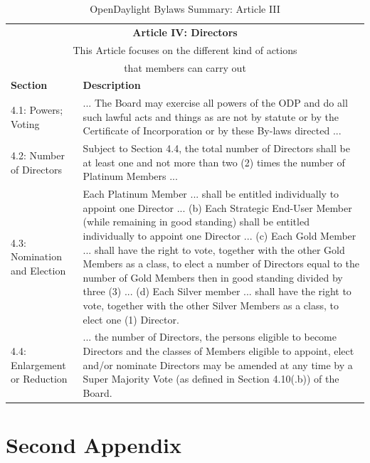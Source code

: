 \documentclass[a4paper, 12pt]{book}
\begin{document}
\begin{table}[H]
  \begin{center}
    \begin{tabular}{ | p{4cm} | p{11cm} | }
    \toprule
    \multicolumn {2}{|c|}{\textbf{Article IV: Directors}} \\
    \multicolumn {2}{|c|}{This Article focuses on the different kind of actions} \\
    \multicolumn {2}{|c|}{that members can carry out} \\
    \hline
    \textbf{Section} & \textbf{Description} \\
    \hline
    4.1: Powers; Voting & ... The Board may exercise all powers of the ODP and do all such lawful acts and things as are not by statute or by the Certificate of Incorporation or by these By-laws directed ...\\
    \hline
    4.2: Number of Directors & Subject to Section 4.4, the total number of Directors shall be at least one and not more than two (2) times the number of Platinum Members ...\\
    \hline
    4.3:  Nomination and Election & Each Platinum Member ... shall be entitled individually to appoint one Director ... (b) Each Strategic End-User Member (while remaining in good standing) shall be entitled individually to appoint one Director ... (c) Each Gold Member ... shall have the right to vote, together with the other Gold Members as a class, to elect a number of Directors equal to the number of Gold Members then in good standing divided by three (3) ... (d) Each Silver member ... shall have the right to vote, together with the other Silver Members as a class, to elect one (1) Director. \\
    \hline
    4.4: Enlargement or Reduction & ... the number of Directors, the persons eligible to become Directors and the classes of Members eligible to appoint, elect and/or nominate Directors may be amended at any time by a Super Majority Vote (as defined in Section 4.10(.b)) of the Board.\\
    \hline
    \bottomrule
    \end{tabular}
    \caption{OpenDaylight Bylaws Summary: Article III}
    \label{tab:odlbylaws-art03}
  \end{center}
\end{table}


\chapter{Second Appendix}




\label{Bibliography}
\end{document}
